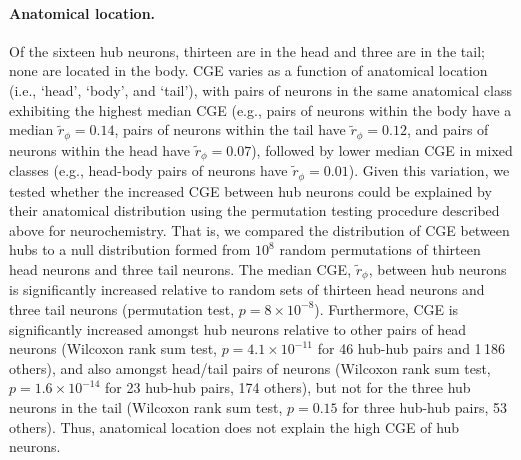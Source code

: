 {\paragraph{Anatomical location.}
Of the sixteen hub neurons, thirteen are in the head and three are in the tail; none are located in the body.
CGE varies as a function of anatomical location (i.e., `head', `body', and `tail'), with pairs of neurons in the same anatomical class exhibiting the highest median CGE (e.g., pairs of neurons within the body have a median $\tilde{r}_\phi = 0.14$, pairs of neurons within the tail have $\tilde{r}_\phi = 0.12$, and pairs of neurons within the head have $\tilde{r}_\phi = 0.07$), followed by lower median CGE in mixed classes (e.g., head-body pairs of neurons have $\tilde{r}_\phi = 0.01$).
Given this variation, we tested whether the increased CGE between hub neurons could be explained by their anatomical distribution using the permutation testing procedure described above for neurochemistry.
That is, we compared the distribution of CGE between hubs to a null distribution formed from $10^8$ random permutations of thirteen head neurons and three tail neurons.
The median CGE, $\tilde{r}_\phi$, between hub neurons is significantly increased relative to random sets of thirteen head neurons and three tail neurons (permutation test, $p = 8\times10^{-8}$).
Furthermore, CGE is significantly increased amongst hub neurons relative to other pairs of head neurons (Wilcoxon rank sum test, $p = 4.1 \times 10^{-11}$ for 46 hub-hub pairs and 1\,186 others),
and also amongst head/tail pairs of neurons (Wilcoxon rank sum test, $p = 1.6 \times 10^{-14}$ for 23 hub-hub pairs, 174 others),
but not for the three hub neurons in the tail (Wilcoxon rank sum test, $p = 0.15$ for three hub-hub pairs, 53 others).
Thus, anatomical location does not explain the high CGE of hub neurons.

}
